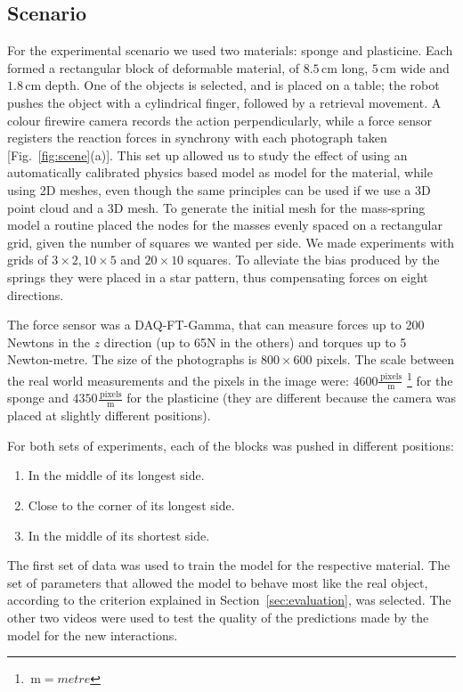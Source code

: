 \documentclass[journal]{IEEEtran}
\newcommand{\fref}[1]{Fig.~\ref{#1}}
\newcommand{\sref}[1]{Section~\ref{#1}}
\newcommand{\unit}[1]{\ensuremath{\, \mathrm{#1}}}
\begin{document}
\subsection{Scenario}
For the experimental scenario we used two materials: sponge and plasticine. Each formed a rectangular block of deformable material, of $8.5 \unit{cm}$ long, $5 \unit{cm}$ wide and $1.8 \unit{cm}$ depth. One of the objects is selected, and is placed on a table; the robot pushes the object with a cylindrical finger, followed by a retrieval movement.  A colour firewire camera records the action perpendicularly, while a force sensor registers the reaction forces in synchrony with each photograph taken [\fref{fig:scene}(a)].  This set up allowed us to study the effect of using an automatically calibrated physics based model as model for the material, while using 2D meshes, even though the same principles can be used if we use a 3D point cloud and a 3D mesh.  To generate the initial mesh for the mass-spring model a routine placed the nodes for the masses evenly spaced on a rectangular grid, given the number of squares we wanted per side.  We made experiments with grids of $3 \times 2, 10 \times 5$ and $20 \times 10$ squares.  To alleviate the bias produced by the springs they were placed in a star pattern, thus compensating forces on eight directions.

The force sensor was a DAQ-FT-Gamma, that can measure forces up to 200 Newtons in the $z$ direction (up to 65N in the others) and torques up to 5 Newton-metre.  The size of the photographs is $800 \times 600$ pixels.  The scale between the real world measurements and the pixels in the image were: $4600\frac{\unit{pixels}}{\unit{m}}$ \footnote{$\unit{m}=metre$} for the sponge and $4350\frac{\unit{pixels}}{\unit{m}}$ for the plasticine (they are different because the camera was placed at slightly different positions).

For both sets of experiments, each of the blocks was pushed in different positions:
\begin{enumerate}
 \item In the middle of its longest side.
 \item Close to the corner of its longest side.
 \item In the middle of its shortest side.
\end{enumerate}
The first set of data was used to train the model for the respective material.  The set of parameters that allowed the model to behave most like the real object, according to the criterion explained in \sref{sec:evaluation}, was selected.  The other two videos were used to test the quality of the predictions made by the model for the new interactions.
\end{document}
